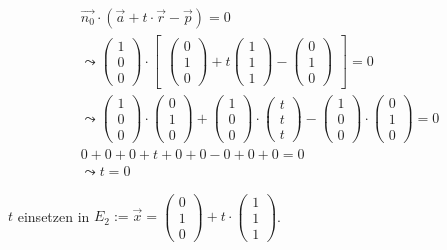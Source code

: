\begin{gather}
\vec{n_0} \cdot (\vec{a}+t\cdot \vec{r}-\vec{p})=0\\
\leadsto 
\begin{pmatrix}
1\\0\\0
\end{pmatrix} \cdot 
\begin{bmatrix}
\begin{pmatrix}
0\\1\\0
\end{pmatrix}
+ t
\begin{pmatrix}
1\\1\\1
\end{pmatrix}
-
\begin{pmatrix}
0\\1\\0
\end{pmatrix}
\end{bmatrix} = 0\\
\leadsto
\begin{pmatrix}
1\\0\\0
\end{pmatrix}\cdot
\begin{pmatrix}
0\\1\\0
\end{pmatrix}
+
\begin{pmatrix}
1\\0\\0
\end{pmatrix}
\cdot
\begin{pmatrix}
t\\t\\t
\end{pmatrix}
-
\begin{pmatrix}
1\\0\\0
\end{pmatrix}
\cdot
\begin{pmatrix}
0\\1\\0
\end{pmatrix} =0\\
0+0+0+t+0+0-0+0+0=0\\
\leadsto t=0
\end{gather}

\ensuremath{t} einsetzen in \ensuremath{E_2:= \vec{x}=\begin{pmatrix}
		0\\1\\0
	\end{pmatrix} +t\cdot\begin{pmatrix}
		1\\1\\1
\end{pmatrix}}.\\

